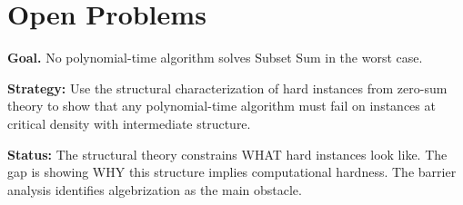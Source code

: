 \chapter{Open Problems}

\begin{theorem}[$\PP \neq \NP$]
  \label{thm:p_ne_np}
  \textbf{Goal.} No polynomial-time algorithm solves Subset Sum in the
  worst case.

  \textbf{Strategy:} Use the structural characterization of hard instances
  from zero-sum theory to show that any polynomial-time algorithm must fail
  on instances at critical density with intermediate structure.

  \textbf{Status:} The structural theory constrains WHAT hard instances
  look like. The gap is showing WHY this structure implies computational
  hardness. The barrier analysis identifies algebrization as the main obstacle.
\end{theorem}
